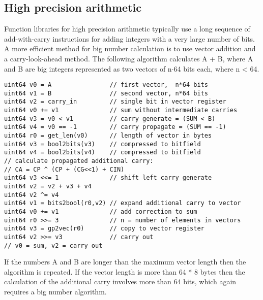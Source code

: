 \documentclass[forwardcom.tex]{subfiles}
\begin{document}


\subsection{High precision arithmetic} \label{highPrecisionArithmetic}
Function libraries for high precision arithmetic typically use a long sequence of add-with-carry instructions for adding integers with a very large number of bits. A more efficient method for big number calculation is to use vector addition and a carry-look-ahead method. The following algorithm calculates A + B, where A and B are big integers represented as two vectors of n$\cdot$64 bits each, where n \textless{} 64.
\vv

\begin{example}
\label{exampleHighPrecisionArithmetic}
\end{example}
\begin{lstlisting}[frame=single]
uint64 v0 = A                // first vector,  n*64 bits
uint64 v1 = B                // second vector, n*64 bits
uint64 v2 = carry_in         // single bit in vector register
uint64 v0 += v1              // sum without intermediate carries
uint64 v3 = v0 < v1          // carry generate = (SUM < B)
uint64 v4 = v0 == -1         // carry propagate = (SUM == -1) 
uint64 r0 = get_len(v0)      // length of vector in bytes
uint64 v3 = bool2bits(v3)    // compressed to bitfield
uint64 v4 = bool2bits(v4)    // compressed to bitfield
// calculate propagated additional carry:
// CA = CP ^ (CP + (CG<<1) + CIN)
uint64 v3 <<= 1              // shift left carry generate
uint64 v2 = v2 + v3 + v4
uint64 v2 ^= v4
uint64 v1 = bits2bool(r0,v2) // expand additional carry to vector
uint64 v0 += v1              // add correction to sum
uint64 r0 >>= 3              // n = number of elements in vectors
uint64 v3 = gp2vec(r0)       // copy to vector register
uint64 v2 >>= v3             // carry out
// v0 = sum, v2 = carry out
\end{lstlisting}
\vv

If the numbers A and B are longer than the maximum vector length then the algorithm is repeated. If the vector length is more than 64 * 8 bytes then the calculation of the additional carry involves more than 64 bits, which again requires a big number algorithm.
\end{document}
